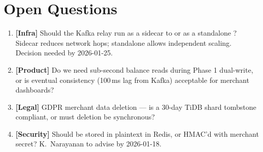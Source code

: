 \section{Open Questions}

\begin{enumerate}
  \item \textbf{[Infra]} Should the Kafka relay run as a sidecar to 
        or as a standalone ? Sidecar reduces network hops;
        standalone allows independent scaling. Decision needed by 2026-01-25.

  \item \textbf{[Product]} Do we need sub-second balance reads during Phase 1 dual-write,
        or is eventual consistency (100\,ms lag from Kafka) acceptable for merchant dashboards?

  \item \textbf{[Legal]} GDPR merchant data deletion — is a 30-day TiDB shard tombstone
        compliant, or must deletion be synchronous?

  \item \textbf{[Security]} Should  be stored in plaintext in Redis,
        or HMAC'd with merchant secret? K.\ Narayanan to advise by 2026-01-18.
\end{enumerate}

